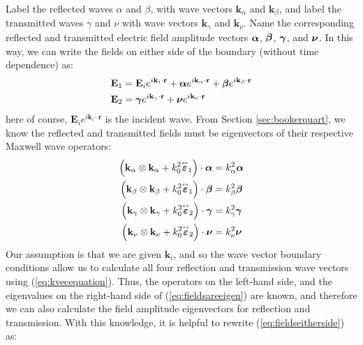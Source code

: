 \documentclass[11pt, reqno]{book}%
\newcounter{ct}
\newcommand{\mbf}{\mathbf}
\newcommand{\mbfg}[1]{\mbf{\mbox{\boldmath$#1$}}}
\newcommand{\ve}{\varepsilon}
\newcommand{\tens}{\overset{\text{\tiny$\leftrightarrow$}}}
\begin{document}
Label the reflected waves $\alpha$ and $\beta$, with wave vectors $\mbf{k}_\alpha$ and $\mbf{k}_\beta$, and label the transmitted waves $\gamma$ and $\nu$ with wave vectors $\mbf{k}_\gamma$ and $\mbf{k}_\nu$. Name the corresponding reflected and transmitted electric field amplitude vectors $\mbfg{\alpha}$, $\mbfg{\beta}$, $\mbfg{\gamma}$, and $\mbfg{\nu}$. In this way, we can write the fields on either side of the boundary (without time dependence) as:
\begin{subequations}
\begin{align}
\mbf{E}_1 &= \mbf{E}_{i} e^{i \mbf{k}_i \cdot \mbf{r}} + \mbfg{\alpha}e^{i\mbf{k}_\alpha \cdot \mbf{r}} +\mbfg{\beta} e^{i\mbf{k}_\beta \cdot \mbf{r}} \\
\mbf{E}_2 & = \mbfg{\gamma}  e^{i\mbf{k}_\gamma\cdot \mbf{r}} + \mbfg{\nu} e^{i\mbf{k}_\nu \cdot \mbf{r}}
\end{align}
\label{eq:fieldseitherside}%
\end{subequations}
\noindent here of course, $\mbf{E}_i e^{i\mbf{k}_i \cdot \mbf{r}}$ is the incident wave. From Section \ref{sec:bookerquart}, we know the reflected and transmitted fields must be eigenvectors of their respective Maxwell wave operators:
\begin{subequations}
\begin{align}
\left(\mbf{k}_\alpha \otimes \mbf{k}_\alpha +k^2_0 \tens{\mbfg{\ve}}_1 \right) \cdot \mbfg{\alpha} & = k^2_\alpha \mbfg{\alpha}  \\
\left(\mbf{k}_\beta \otimes \mbf{k}_\beta +k^2_0 \tens{\mbfg{\ve}}_1 \right) \cdot \mbfg{\beta} & = k^2_\beta \mbfg{\beta} \\
\left(\mbf{k}_\gamma \otimes \mbf{k}_\gamma +k^2_0 \tens{\mbfg{\ve}}_2 \right) \cdot \mbfg{\gamma} & = k^2_\gamma \mbfg{\gamma}  \\
\left(\mbf{k}_\nu \otimes \mbf{k}_\nu +k^2_0 \tens{\mbfg{\ve}}_2 \right) \cdot \mbfg{\nu} & = k^2_\nu \mbfg{\nu} 
\end{align}
\label{eq:fieldsareeigen}%
\end{subequations}
Our assumption is that we are given $\mbf{k}_i$, and so the wave vector boundary conditions allow us to calculate all four reflection and transmission wave vectors using (\ref{eq:kvecequation}). Thus, the operators on the left-hand side, and the eigenvalues on the right-hand side of (\ref{eq:fieldsareeigen}) are known, and therefore we can also calculate the field amplitude eigenvectors for reflection and transmission. With this knowledge, it is helpful to rewrite (\ref{eq:fieldseitherside}) as:
\end{document}
